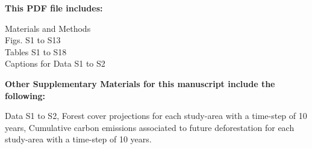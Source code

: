 \vspace{1cm}

\noindent \textbf{This PDF file includes:}
\begin{flushleft}
Materials and Methods \\
Figs. S1 to S13 \\
Tables S1 to S18 \\
Captions for Data S1 to S2
\end{flushleft}

\vspace{1cm}

\noindent \textbf{Other Supplementary Materials for this manuscript include the following:}
\begin{flushleft}
Data S1 to S2, Forest cover projections for each study-area with a time-step of 10 years, Cumulative carbon emissions associated to future deforestation for each study-area with a time-step of 10 years.
\end{flushleft}

\newpage
